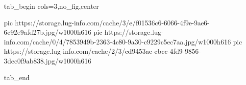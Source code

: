  
 
 
 
 


\ifcmt
  tab_begin cols=3,no_fig,center

     pic https://storage.lug-info.com/cache/3/e/f01536c6-6066-4f9e-9ae6-6c92e9afd27b.jpg/w1000h616
		 pic https://storage.lug-info.com/cache/0/4/7853949b-2363-4c80-9a30-c9229c5ec7aa.jpg/w1000h616
		 pic https://storage.lug-info.com/cache/2/3/cd9453ae-cbcc-4fd9-9856-3dec0f9ab838.jpg/w1000h616

  tab_end
\fi
